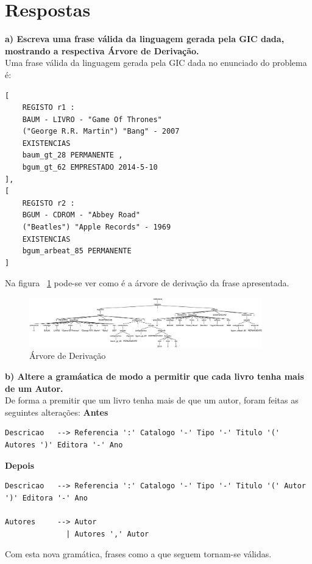 \section{Respostas}
\label{sub:alinea_a}
\textbf{a) Escreva uma frase válida da linguagem gerada pela GIC dada, mostrando a respectiva Árvore de Derivação.}\\
Uma frase válida da linguagem gerada pela GIC dada no enunciado do problema é:

\begin{verbatim}
[
	REGISTO r1 :
	BAUM - LIVRO - "Game Of Thrones"
	("George R.R. Martin") "Bang" - 2007
	EXISTENCIAS
	baum_gt_28 PERMANENTE ,
	bgum_gt_62 EMPRESTADO 2014-5-10
],
[
	REGISTO r2 :
	BGUM - CDROM - "Abbey Road"
	("Beatles") "Apple Records" - 1969
	EXISTENCIAS
	bgum_arbeat_85 PERMANENTE
]
\end{verbatim}

Na figura ~\ref{fig:alinea_a} pode-se ver como é a árvore de derivação da frase apresentada.

\begin{figure}[!h]
	\centering
    \includegraphics[width=0.9\textwidth]{./imagens/alineaa.png}
    \caption{Árvore de Derivação}
    \label{fig:alinea_a}
\end{figure}

\label{sub:alinea_b}

\textbf{b) Altere a gramáatica de modo a permitir que cada livro tenha mais de um Autor.}\\
De forma a premitir que um livro tenha mais de que um autor, foram feitas as seguintes alterações:
\textbf{Antes}
\begin{verbatim}
Descricao   --> Referencia ':' Catalogo '-' Tipo '-' Titulo '(' Autores ')' Editora '-' Ano

\end{verbatim}
\textbf{Depois}
\begin{verbatim}
Descricao   --> Referencia ':' Catalogo '-' Tipo '-' Titulo '(' Autor ')' Editora '-' Ano

Autores     --> Autor
              | Autores ',' Autor

\end{verbatim}

Com esta nova gramática, frases como a que seguem tornam-se válidas.

